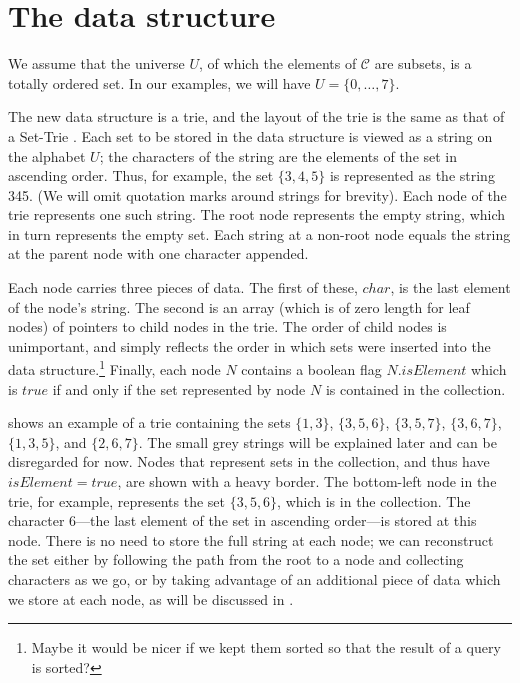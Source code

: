 \section{The data structure}

We assume that the universe $U$, of which the elements of $\mathcal{C}$ are
subsets, is a totally ordered set.  In our examples, we will have $U = \{0, \dots, 7\}$.

The new data structure is a trie, and the layout of the trie is the same as
that of a Set-Trie \cite{DBLP:conf/IEEEares/Savnik13}.  Each set to be stored
in the data structure is viewed as a
string on the alphabet $U$; the characters of the string are the
elements of the set in ascending order.  Thus, for example, the set $\{3,4,5\}$ is
represented as the string 345.  (We will omit quotation marks around strings
for brevity).  Each node of the trie
represents one such string. The root node represents the empty string,
which in turn represents the empty set.  Each string at a non-root node equals the string at
the parent node with one character appended.

Each node carries three pieces of data.  The first of these, $\mathit{char}$,
is the last element of the node's string.  The second is an array (which is of
zero length for leaf nodes) of pointers to child nodes in the trie. The order
of child nodes is unimportant, and simply reflects the order in which sets were
inserted into the data structure.\footnote{Maybe it would be nicer if we kept
them sorted so that the result of a query is sorted?} Finally, each node $N$
contains a boolean flag $N.\mathit{isElement}$ which is $\mathit{true}$ if
and only if the set represented by node $N$ is contained in the collection.

 shows an example of a trie containing the sets
$\{1,3\}$,
$\{3,5,6\}$,
$\{3,5,7\}$,
$\{3,6,7\}$,
$\{1,3,5\}$, and
$\{2,6,7\}$.  The small grey strings will be explained later and can be disregarded
for now.  Nodes that represent sets in the collection, and thus have $\mathit{isElement}=\mathit{true}$,
    are shown with a heavy border.
The bottom-left node in the trie, for example, represents the set $\{3,5,6\}$, which is in the
collection.  The character 6---the last element of the set in ascending order---is
stored at this node.  There is no need to store the full string at each node; we can
reconstruct the set either by following the path from the root to a node and collecting
characters as we go, or by taking advantage of an additional piece of data which we store
at each node, as will be discussed in .

